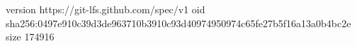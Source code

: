 version https://git-lfs.github.com/spec/v1
oid sha256:0497e910c39d3de963710b3910c93d40974950974c65fe27b5f16a13a0b4bc2e
size 174916

